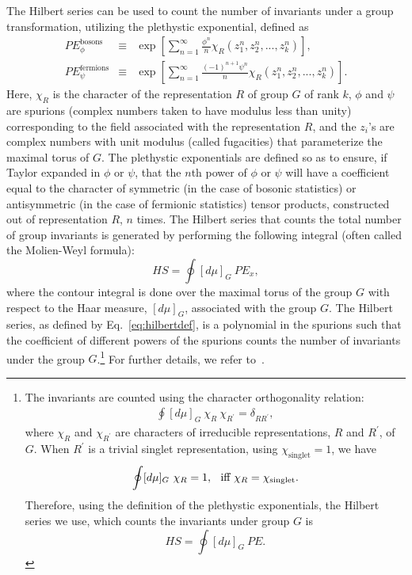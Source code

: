 \documentclass[prd,onecolumn, nofootinbib, 11pt]{revtex4}
\begin{document}
The Hilbert series can be used to count the number of invariants under a group transformation, utilizing the plethystic exponential, defined as
%
\begin{eqnarray}
\label{pebosons}
PE^\text{bosons}_\phi &\equiv& \exp\left[ \displaystyle \sum_{n=1}^\infty \frac{\phi^n}{n} \chi_{R}(z_1^n, z_2^n,...,z_k^n) \right] , \\
\label{pefermions}
PE^\text{fermions}_\psi &\equiv& \exp\left[ \displaystyle \sum_{n=1}^\infty \frac{(-1)^{n+1}\psi^n}{n} \chi_{R}(z_1^n, z_2^n,...,z_k^n) \right] .
\end{eqnarray}
%
Here, $\chi_{R}$ is the character of the representation $R$ of group $G$ of rank $k$, $\phi$ and $\psi$ are spurions (complex numbers taken to have modulus less than unity) corresponding to the field associated with the representation $R$, and the $z_i$'s are complex numbers with unit modulus (called fugacities) that parameterize the maximal torus of $G$.  
The plethystic exponentials are defined so as to ensure, if Taylor expanded in $\phi$ or $\psi$, that the $n$th power of $\phi$ or $\psi$ will have a coefficient equal to the character of symmetric (in the case of bosonic statistics) or antisymmetric (in the case of fermionic statistics) tensor products, constructed out of representation $R$, $n$ times. 
The Hilbert series that counts the total number of group invariants is generated by performing the following integral (often called the Molien-Weyl formula):
\begin{equation}\label{eq:hilbertdef}
HS = \oint [d\mu]_G  ~PE_x,
\end{equation}
%
where the contour integral is done over the maximal torus of the group $G$ with respect to the Haar measure, $[d\mu]_G$, associated with the group $G$.  The Hilbert series, as defined by Eq.~\eqref{eq:hilbertdef}, is a polynomial in the spurions such that the coefficient of different powers of the spurions counts the number of invariants under the group $G$.\footnote{The invariants are counted using the character orthogonality relation: 
\begin{align}
\oint [d\mu]_G ~\chi_{R}~\chi_{R^{\prime}}=\delta_{RR^{\prime}},
\end{align}
where $\chi_{R}$ and $\chi_{R^{\prime}}$ are characters of irreducible representations, $R$ and $R^{\prime}$, of $G$. When $R^{\prime}$ is a trivial singlet representation, using $\chi_{\text{singlet}}=1$, we have
\begin{equation}
\oint [d\mu]_G ~\chi_{R}= 1, \hspace{0.1in} \text{iff} ~\chi_R = \chi_{\text{singlet}}.
\end{equation}
Therefore, using the definition of the plethystic exponentials, the Hilbert series we use, which counts the invariants under group $G$ is 
\begin{equation}
HS = \oint [d\mu]_G~ PE.
\end{equation}
}
For further details, we refer to~\cite{Jenkins:2009dy, Hanany:2010vu, Feng:2007ur, Henning:2015daa, Henning:2015alf}.
\end{document}
